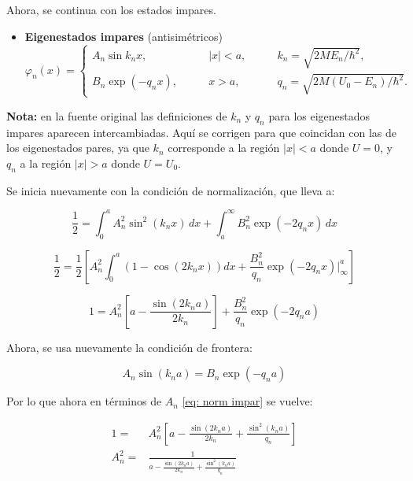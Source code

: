 Ahora, se continua con los estados impares. 

\begin{itemize}
    \item \textbf{Eigenestados impares} (antisimétricos)
    \begin{equation}
        \varphi_n\left(x\right) = \left\{
        \begin{array}{lll}
            A_n \sin k_n x, & \qquad |x| < a, & \qquad k_n = \sqrt{2ME_n/\hbar^2}, \\
            B_n \exp\left(-q_n x\right), & \qquad x > a, & \qquad q_n = \sqrt{2M\left(U_0 - E_n\right)/\hbar^2}.
        \end{array}
        \right.
    \end{equation}
\end{itemize}

\textbf{Nota:} en la fuente original las definiciones de $k_n$ y $q_n$ para los eigenestados impares aparecen intercambiadas. Aquí se corrigen para que coincidan con las de los eigenestados pares, ya que $k_n$ corresponde a la región $|x|<a$ donde $U=0$, y $q_n$ a la región $|x|>a$ donde $U=U_0$.

Se inicia nuevamente con la condición de normalización, que lleva a:

\begin{equation}
    \frac{1}{2} = \int_0^a A_n^2 \sin^2(k_nx) \, dx + \int_a^{\infty} B_n^2 \exp(-2q_nx) \, dx
\end{equation}

\begin{equation}
    \frac{1}{2} = \frac{1}{2}\left[A_n^2 \int_0^a \left(1-\cos(2k_nx)\right) dx + \frac{B_n^2}{q_n}\exp(-2q_nx)\Big|_{\infty}^{a}\right]
\end{equation}

\begin{equation}
    1 = A_n^2\left[a-\frac{\sin(2k_na)}{2k_n}\right] + \frac{B_n^2}{q_n}\exp(-2q_na)
    \label{eq: norm impar}
\end{equation}

Ahora, se usa nuevamente la condición de frontera:

\begin{equation}
    A_n\sin(k_na) = B_n\exp(-q_na)
    \label{eq: cond front impar}
\end{equation}

Por lo que ahora en términos de $A_n$ \ref{eq: norm impar} se vuelve:

\begin{align}
    1 =& A_n^2\left[a-\frac{\sin(2k_na)}{2k_n}+\frac{\sin^2(k_na)}{q_n}\right] \\
    A_n^2 =& \frac{1}{a-\frac{\sin(2k_na)}{2k_n}+\frac{\sin^2(k_na)}{q_n}}
    \label{eq: A2 impar}
\end{align}

